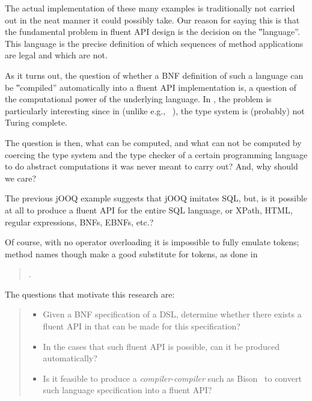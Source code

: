 The actual implementation of these many examples is traditionally not carried
out in the neat manner it could possibly take. Our reason for saying this is
that the fundamental problem in fluent API design is the decision on the
‟language”. This language is the precise definition of which sequences of
method applications are legal and which are not.

As it turns out, the question of whether a BNF definition of such a language
can be ‟compiled” automatically into a fluent API implementation is, a
question of the computational power of the underlying language. In \Java, the problem
is particularly interesting since in \Java (unlike e.g., \CC~\cite{Gutterman:2003}),
the type system is (probably) not Turing complete.

The question is then, what can be computed, and what can not be computed by
coercing the type system and the type checker of a certain programming language
to do abstract computations it was never meant to carry out? And, why should we
care?

The previous jOOQ example suggests that jOOQ imitates SQL, but, is it possible at
all to produce a fluent API for the entire SQL language, or XPath, HTML,
regular expressions, BNFs, EBNFs, etc.?

Of course, with no operator overloading it is impossible
to fully emulate tokens; method names though make a good substitute for tokens, as done
in
\begin{quote}
  .
\end{quote}

The questions that motivate this research are:
\begin{quote}
  \begin{itemize}
    \item Given a BNF specification of a DSL, determine whether there exists a
      fluent API in \Java that can be made for this specification?

    \item In the cases that such fluent API is possible, can it be produced
      automatically?

    \item Is it feasible to produce a \emph{compiler-compiler} such as
      Bison~\cite{Bison:manual} to convert such language specification into a
      fluent API?

\end{itemize}
\end{quote}


